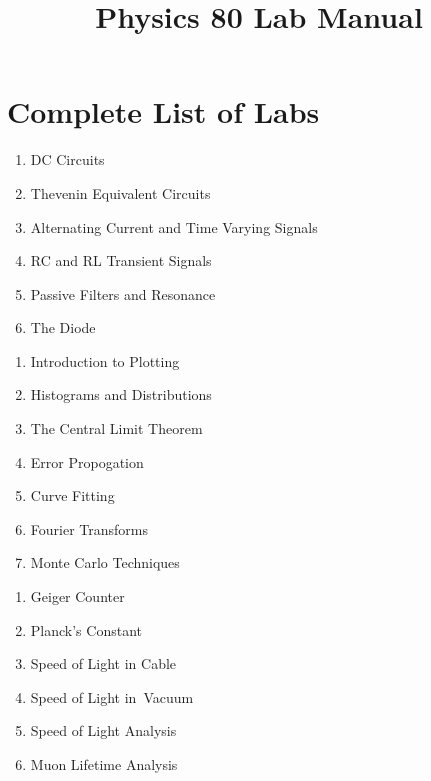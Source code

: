 \documentclass[12pt,oneside]{book}
\begin{document}

\title{Physics 80 Lab Manual}

\maketitle











\chapter{Complete List of Labs}

\begin{enumerate}
\item DC Circuits
\item Thevenin Equivalent Circuits
\item Alternating Current and Time Varying Signals
\item RC and RL Transient Signals
\item Passive Filters and Resonance
\item The Diode
\end{enumerate}

\begin{enumerate}[resume]
\item Introduction to Plotting
\item Histograms and Distributions
\item The Central Limit Theorem
\item Error Propogation
\item Curve Fitting
\item Fourier Transforms
\item Monte Carlo Techniques
\end{enumerate}

\begin{enumerate}[resume]
\item Geiger Counter
\item Planck's Constant
\item Speed of Light in Cable
\item Speed of Light in\ Vacuum
\item Speed of Light Analysis
\item Muon Lifetime Analysis
\end{enumerate}
\end{document}
